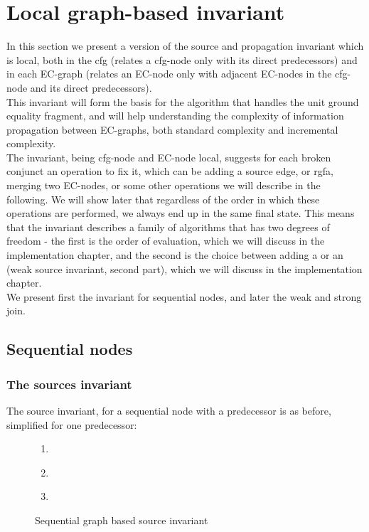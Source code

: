 \newpage
\section{Local graph-based invariant}
In this section we present a version of the source and propagation invariant which is local, 
both in the cfg (relates a cfg-node only with its direct predecessors) 
and in each EC-graph (relates an EC-node only with adjacent EC-nodes in the cfg-node and its direct predecessors).\\
This invariant will form the basis for the algorithm that handles the unit ground equality fragment, 
and will help understanding the complexity of information propagation between EC-graphs, 
both standard complexity and incremental complexity.\\
The invariant, being cfg-node and EC-node local, suggests for each broken conjunct an operation to fix it, 
which can be adding a source edge, \GFA{} or rgfa, merging two EC-nodes, or some other operations we will describe in the following.
We will show later that regardless of the order in which these operations are performed, we always end up in the same final state.
This means that the invariant describes a family of algorithms that has two degrees of freedom - 
the first is the order of evaluation, which we will discuss in the implementation chapter, 
and the second is the choice between adding a \GFA{} or an \RGFA{} (weak source invariant, second part), 
which we will discuss in the implementation chapter.\\
We present first the invariant for sequential nodes, and later the weak and strong join.

\subsection{Sequential nodes}

\subsubsection{The sources invariant}
The source invariant, for a sequential node  with a predecessor  is as before, simplified for one predecessor:
\begin{figure}[H]
\begin{enumerate}
	\item {}\\
	\item {}\\
	\item {}\\
\end{enumerate}
\caption{Sequential graph based source invariant}
\label{sequential_weak_source_invariant}
\end{figure}

